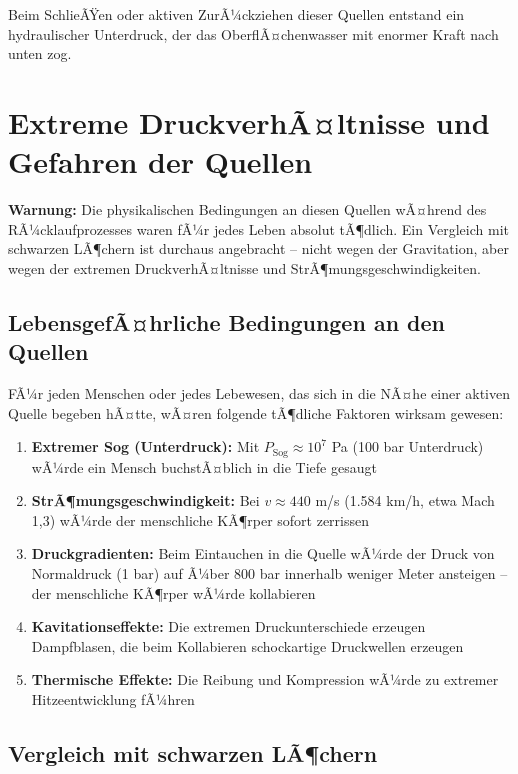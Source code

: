 ﻿\documentclass[12pt,a4paper]{report}
\begin{document}
Beim SchlieÃŸen oder aktiven ZurÃ¼ckziehen dieser Quellen entstand ein hydraulischer Unterdruck, der das OberflÃ¤chenwasser mit enormer Kraft nach unten zog.

\section{Extreme DruckverhÃ¤ltnisse und Gefahren der Quellen}

\textbf{Warnung:} Die physikalischen Bedingungen an diesen Quellen wÃ¤hrend des RÃ¼cklaufpro\-zes\-ses waren fÃ¼r jedes Leben absolut tÃ¶dlich. Ein Vergleich mit schwarzen LÃ¶chern ist durchaus angebracht -- nicht wegen der Gravitation, aber wegen der extremen DruckverhÃ¤ltnisse und StrÃ¶mungsgeschwindigkeiten.

\subsection{LebensgefÃ¤hrliche Bedingungen an den Quellen}

FÃ¼r jeden Menschen oder jedes Lebewesen, das sich in die NÃ¤he einer aktiven Quelle begeben hÃ¤tte, wÃ¤ren folgende tÃ¶dliche Faktoren wirksam gewesen:

\begin{enumerate}
	\item \textbf{Extremer Sog (Unterdruck):} Mit $P_{\text{Sog}} \approx 10^7$ Pa (100 bar Unterdruck) wÃ¼rde ein Mensch buchstÃ¤blich in die Tiefe gesaugt
	
	\item \textbf{StrÃ¶mungsgeschwindigkeit:} Bei $v \approx 440$ m/s (1.584 km/h, etwa Mach 1,3) wÃ¼rde der menschliche KÃ¶rper sofort zerrissen
	
	\item \textbf{Druckgradienten:} Beim Eintauchen in die Quelle wÃ¼rde der Druck von Normaldruck (1 bar) auf Ã¼ber 800 bar innerhalb weniger Meter ansteigen -- der menschliche KÃ¶rper wÃ¼rde kollabieren
	
	\item \textbf{Kavitationseffekte:} Die extremen Druckunterschiede erzeugen Dampfblasen, die beim Kollabieren schockartige Druckwellen erzeugen
	
	\item \textbf{Thermische Effekte:} Die Reibung und Kompression wÃ¼rde zu extremer Hitzeentwicklung fÃ¼hren
\end{enumerate}

\subsection{Vergleich mit schwarzen LÃ¶chern}
\end{document}
